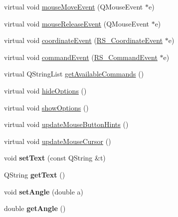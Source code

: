 \begin{DoxyCompactItemize}
\item 
virtual void \hyperlink{classRS__ActionDrawMText_a2bba446e0d660e789a08588996b606f4}{mouse\-Move\-Event} (Q\-Mouse\-Event $\ast$e)
\item 
virtual void \hyperlink{classRS__ActionDrawMText_acc56403cd811489460bd8b132f17af4f}{mouse\-Release\-Event} (Q\-Mouse\-Event $\ast$e)
\item 
virtual void \hyperlink{classRS__ActionDrawMText_afc1c1a73e6d800fbf7aa661b5bf26085}{coordinate\-Event} (\hyperlink{classRS__CoordinateEvent}{R\-S\-\_\-\-Coordinate\-Event} $\ast$e)
\item 
virtual void \hyperlink{classRS__ActionDrawMText_ab80a8d4eb1d7e288ab49e4cca5c2fa71}{command\-Event} (\hyperlink{classRS__CommandEvent}{R\-S\-\_\-\-Command\-Event} $\ast$e)
\item 
virtual Q\-String\-List \hyperlink{classRS__ActionDrawMText_a6a4768f04961f1a253b6ac090505355d}{get\-Available\-Commands} ()
\item 
virtual void \hyperlink{classRS__ActionDrawMText_a82ac44cf5a61a99ea59426bd5c3691d3}{hide\-Options} ()
\item 
virtual void \hyperlink{classRS__ActionDrawMText_a61c5075973a889b546526c59f0e65651}{show\-Options} ()
\item 
virtual void \hyperlink{classRS__ActionDrawMText_a9257186393fac129f89957057901c3af}{update\-Mouse\-Button\-Hints} ()
\item 
virtual void \hyperlink{classRS__ActionDrawMText_a733c88126f76536e2c8feedcc103f8b3}{update\-Mouse\-Cursor} ()
\item 
\hypertarget{classRS__ActionDrawMText_a51c7f83f2b2f86b2abe7be9c887485db}{void {\bfseries set\-Text} (const Q\-String \&t)}\label{classRS__ActionDrawMText_a51c7f83f2b2f86b2abe7be9c887485db}

\item 
\hypertarget{classRS__ActionDrawMText_a69efc331ef98ebc6150d124b924459ca}{Q\-String {\bfseries get\-Text} ()}\label{classRS__ActionDrawMText_a69efc331ef98ebc6150d124b924459ca}

\item 
\hypertarget{classRS__ActionDrawMText_a1538eca633646bca9a4ec46cd1dcc3cf}{void {\bfseries set\-Angle} (double a)}\label{classRS__ActionDrawMText_a1538eca633646bca9a4ec46cd1dcc3cf}

\item 
\hypertarget{classRS__ActionDrawMText_a3021c438d2ed064edbd1dc56d96e877c}{double {\bfseries get\-Angle} ()}\label{classRS__ActionDrawMText_a3021c438d2ed064edbd1dc56d96e877c}

\end{DoxyCompactItemize}
